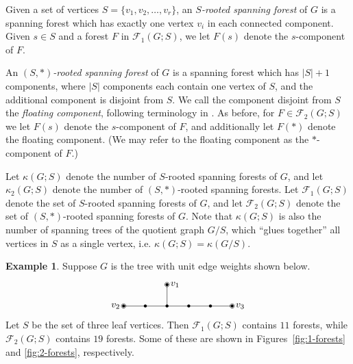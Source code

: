\documentclass{amsart}
\theoremstyle{definition}
\newtheorem{eg}[thm]{Example}
\newcommand{\trees}{\mathcal{F}_1}
\newcommand{\forests}{\mathcal{F}}
\begin{document}
Given a set of vertices $S = \{v_1, v_2, \ldots, v_r\}$,
an {\em $S$-rooted spanning forest} of $G$ 
is a spanning forest which has exactly one vertex $v_i$ in each connected component.
Given $s \in S$ and a forest $F$ in $\trees(G; S)$, we let $F(s)$ denote the $s$-component of $F$.

An {\em $(S,*)$-rooted spanning forest} of $G$ is a spanning forest which has $|S|+1$ components, where $|S|$ components each contain one vertex of $S$, and the additional component is disjoint from $S$.
We call the component disjoint from $S$ the {\em floating component}, following terminology in \cite{kassel-kenyon-wu}.
As before, for $F \in \forests_2(G; S)$
we let $F(s)$ denote the $s$-component of $F$, and additionally let $F(*)$ denote the floating component.
(We may refer to the floating component as the $*$-component of $F$.)

Let $\kappa(G;S)$ denote the number of $S$-rooted spanning forests of $G$, and let $\kappa_2(G; S)$ denote the number of $(S,*)$-rooted spanning forests.
Let $\trees(G;S)$ denote the set of $S$-rooted spanning forests of $G$,
and let $\forests_2(G;S)$ denote the set of $(S,*)$-rooted spanning forests of $G$.
Note that $\kappa(G;S)$ is also the number of 
spanning trees of the quotient graph $G / S$, which ``glues together'' all vertices in $S$ as a single vertex,
i.e. $\kappa(G; S) =  \kappa(G/S)$.


\begin{eg}
Suppose $G$ is the tree with unit edge weights shown below.
\[
\begin{tikzpicture}[scale=0.8]
	\coordinate (1) at (0,0);
	\coordinate (A) at (1,0);
	\coordinate (B) at (2,0);
	\coordinate (C) at (3,0);
	\coordinate (D) at (4,0);
	\coordinate (2) at (5,0);
	\coordinate (3) at (2,1);
	
	\foreach \c in {1,2,3,A,B,C,D} {
		\fill (\c) circle (2pt);
	}
	\foreach \c in {1,2,3} {
		\draw (\c) circle (3pt);
	}

	\draw (1) -- (A);
	\draw (A) -- (B);
	\draw (B) -- (3);
	\draw (B) -- (C);
	\draw (C) -- (D);
	\draw (D) -- (2);
	
	\foreach \c/\d/\label in {1/left/v_2,2/right/v_3,3/right/v_1} {
		\node[\d=0.2] at (\c) {$\label$};
	}
\end{tikzpicture}
\]
Let $S$ be the set of three leaf vertices.
Then $\trees(G;S)$ contains $11$ forests,
while $\forests_2(G;S)$ contains $19$ forests.
Some of these are shown in Figures~\ref{fig:1-forests} and \ref{fig:2-forests}, respectively.
\end{eg}
\end{document}
